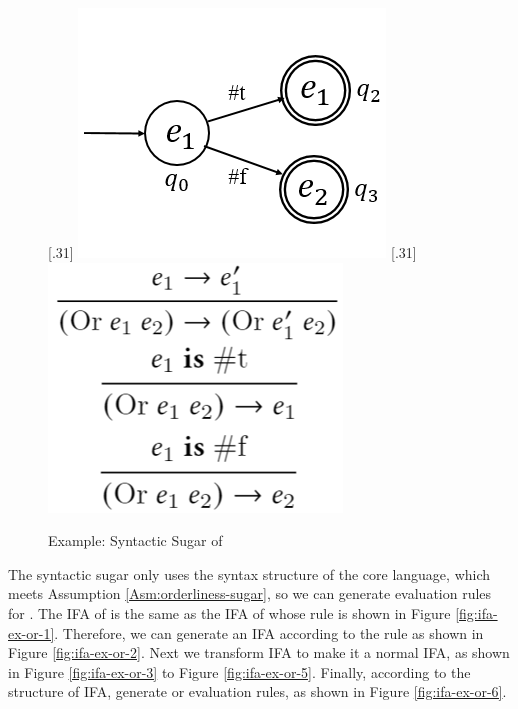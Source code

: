 \begin{example}
\begin{figure}[t]
{        }
        [.31\linewidth]{
            \includegraphics[scale=0.3]{images/ifa/ifa-ex-or-5.png}
        }
        [.31\linewidth]{
            \includegraphics[scale=0.3]{images/ifa/ifa-ex-or-6.png}
        }
        \caption{Example: Syntactic Sugar of }
        \label{fig:ifa-nand-std}
    \end{figure}

    The  syntactic sugar only uses the syntax structure of the core language, which meets Assumption \ref{Asm:orderliness-sugar}, so we can generate evaluation rules for .
    The IFA of  is the same as the IFA of  whose rule is shown in Figure \ref{fig:ifa-ex-or-1}. Therefore, we can generate an IFA according to the rule as shown in Figure \ref{fig:ifa-ex-or-2}. Next we transform IFA to make it a normal IFA, as shown in Figure \ref{fig:ifa-ex-or-3} to Figure \ref{fig:ifa-ex-or-5}. Finally, according to the structure of IFA, generate or evaluation rules, as shown in Figure \ref{fig:ifa-ex-or-6}.
    \myend
\end{example}

